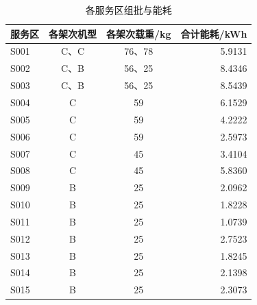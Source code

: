 \begin{table}[htbp]
\centering
\caption{各服务区组批与能耗}
\label{tab:q1:batches}
\begin{tabular}{lccr}
\toprule
服务区 & 各架次机型 & 各架次载重/kg & 合计能耗/kWh \\
\midrule
S001 & C、C & 76、78 & 5.9131 \\
S002 & C、B & 56、25 & 8.4346 \\
S003 & C、B & 56、25 & 8.5439 \\
S004 & C & 59 & 6.1529 \\
S005 & C & 59 & 4.2222 \\
S006 & C & 59 & 2.5973 \\
S007 & C & 45 & 3.4104 \\
S008 & C & 45 & 5.8360 \\
S009 & B & 25 & 2.0962 \\
S010 & B & 25 & 1.8228 \\
S011 & B & 25 & 1.0739 \\
S012 & B & 25 & 2.7523 \\
S013 & B & 25 & 1.8245 \\
S014 & B & 25 & 2.1398 \\
S015 & B & 25 & 2.3073 \\
\bottomrule
\end{tabular}
\end{table}
